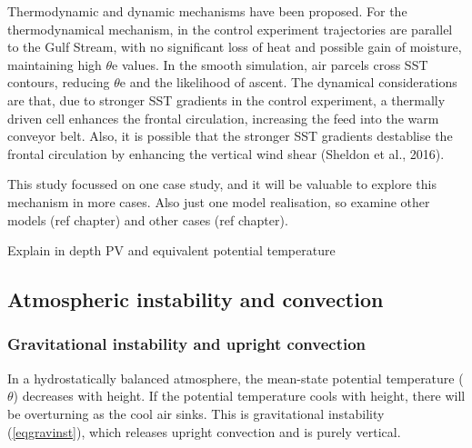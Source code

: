 Thermodynamic and dynamic mechanisms have been proposed. For the thermodynamical mechanism, in the control experiment trajectories are parallel to the Gulf Stream, with no significant loss of heat and possible gain of moisture, maintaining high $\theta$e values. In the smooth simulation, air parcels cross SST contours, reducing $\theta$e and the likelihood of ascent. The dynamical considerations are that, due to stronger SST gradients in the control experiment, a thermally driven cell enhances the frontal circulation, increasing the feed into the warm conveyor belt. Also, it is possible that the stronger SST gradients destablise the frontal circulation by enhancing the vertical wind shear (Sheldon et al., 2016).



This study \cite{sheldon2017warm}  focussed on one case study, and it will be valuable to explore this mechanism in more cases. Also just one model realisation, so examine other models (ref chapter) and other cases (ref chapter).



Explain in depth PV and equivalent potential temperature\\


\subsection{Atmospheric instability and convection}

\subsubsection {Gravitational instability and upright convection}

In a hydrostatically balanced atmosphere, the mean-state potential temperature ($\theta$) decreases with height. If the potential temperature cools with height, there will be overturning as the cool air sinks. This is gravitational instability (\ref{eqgravinst}), which releases upright convection and is purely vertical.

